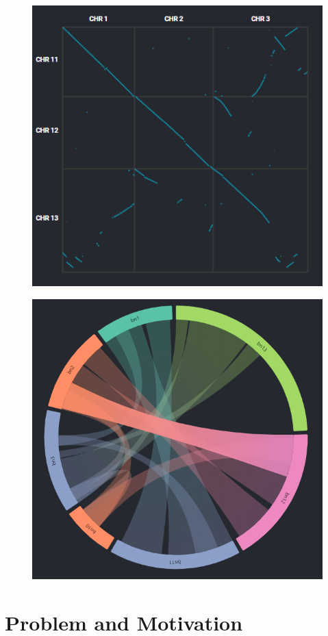 \begin{figure}
\centering
\begin{minipage}{.5\textwidth}
  \centering
  \includegraphics[width=.75\linewidth]{images/ch_1_dot_plot.PNG}
  \label{fig:ch_1_dot_plot}
\end{minipage}%
\begin{minipage}{.5\textwidth}
  \centering
  \includegraphics[width=.75\linewidth]{images/ch_1_circos_plot.PNG}
  \label{fig:ch_1_circos_plot}
\end{minipage}
\end{figure}


\section{Problem and Motivation}

